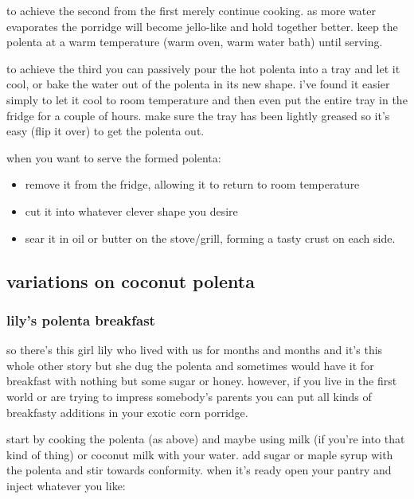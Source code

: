 to achieve the second from the first merely continue cooking. as more water 
evaporates the porridge will become jello-like and hold together better. keep 
the polenta at a warm temperature (warm oven, warm water bath) until serving.

to achieve the third you can passively pour the hot polenta into a tray and 
let it cool, or bake the water out of the polenta in its new shape. i've found 
it easier simply to let it cool to room temperature and then even put the 
entire tray in the fridge for a couple of hours. make sure the tray has been 
lightly greased so it's easy (flip it over) to get the polenta out. 

when you want to serve the formed polenta:

\begin{itemize}

  \item remove it from the fridge, allowing it to return to room temperature

  \item cut it into whatever clever shape you desire

  \item sear it in oil or butter on the stove/grill, forming a tasty crust on 
  each side.

\end{itemize}

\subsection{variations on coconut polenta}

\subsubsection{lily's polenta breakfast}

so there's this girl lily who lived with us for months and months and it's 
this whole other story but she dug the polenta and sometimes would have it 
for breakfast with nothing but some sugar or honey. however, if you live in 
the first world or are trying to impress somebody's parents you can put all 
kinds of breakfasty additions in your exotic corn porridge.

start by cooking the polenta (as above) and maybe using milk (if you're into 
that kind of thing) or coconut milk with your water. add sugar or maple 
syrup with the polenta and stir towards conformity. when it's ready open your 
pantry and inject whatever you like:

